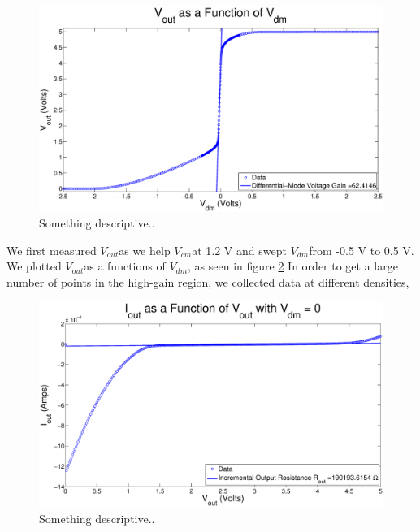 \documentclass{article}
\newcommand{\Vout}{{$V_{out}$}}
\newcommand{\Vcm}{{$V_{cm}$}}
\newcommand{\Vdm}{{$V_{dm}$}}
\begin{document}
\begin{figure}[H]
\centering
\includegraphics[width=\linewidth]{../Figures/Exp2P1.eps}
\caption{Something descriptive..}
\label{fig:exp2p1}
\end{figure}

We first measured \Vout as we help \Vcm at 1.2 V and swept \Vdm from -0.5 V to 0.5 V. We plotted \Vout as a functions of \Vdm, as seen in figure \ref{fig:exp2p2} In order to get a large number of points in the high-gain region, we collected data at different densities,

\begin{figure}[H]
\centering
\includegraphics[width=\linewidth]{../Figures/Exp2P2.eps}
\caption{Something descriptive..}
\label{fig:exp2p2}
\end{figure}
\end{document}
